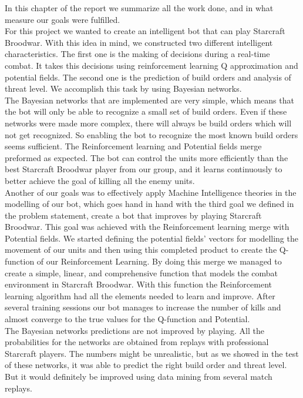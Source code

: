 In this chapter of the report we summarize all the work done, and in what measure our goals were fulfilled. \\

For this project we wanted to create an intelligent bot that can play Starcraft Broodwar. With this idea in mind, we constructed two different intelligent characteristics. The first one is the making of decisions during a real-time combat. It takes this decisions using reinforcement learning Q approximation and potential fields. The second one is the prediction of build orders and analysis of threat level. We accomplish this task by using Bayesian networks. \\

The Bayesian networks that are implemented are very simple, which means that the bot will only be able to recognize a small set of build orders. Even if these networks were made more complex, there will always be build orders which will not get recognized. So enabling the bot to recognize the most known build orders seems sufficient. The Reinforcement learning and Potential fields merge preformed as expected. The bot can control the units more efficiently than the best Starcraft Broodwar player from our group, and it learns continuously to better achieve the goal of killing all the enemy units. \\

Another of our goals was to effectively apply Machine Intelligence theories in the modelling of our bot, which goes hand in hand with the third goal we defined in the problem statement, create a bot that improves by playing Starcraft Broodwar. This goal was achieved with the Reinforcement learning merge with Potential fields. We started defining the potential fields' vectors for modelling the movement of our units and then using this completed product to create the Q-function of our Reinforcement Learning. By doing this merge we managed to create a simple, linear, and comprehensive function that models the combat environment in Starcraft Broodwar. With this function the Reinforcement learning algorithm had all the elements needed to learn and improve. After several training sessions our bot manages to increase the number of kills and almost converge to the true values for the Q-function and Potential.\\

The Bayesian networks predictions are not improved by playing. All the probabilities for the networks are obtained from replays with professional Starcraft players. The numbers might be unrealistic, but as we showed in the test of these networks, it was able to predict the right build order and threat level. But it would definitely be improved using data mining from several match replays. \\

